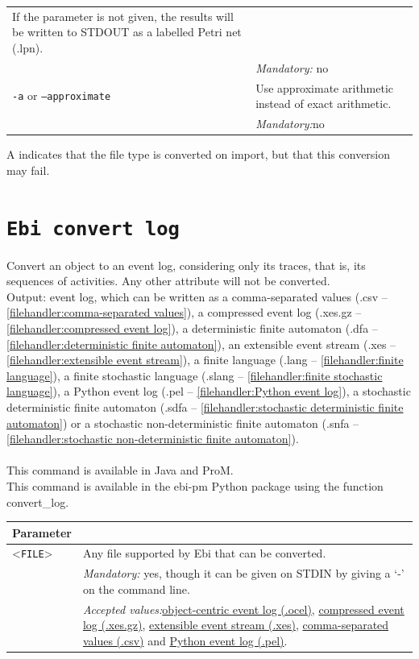 {\begin{tabularx}{\linewidth}{lX}
If the parameter is not given, the results will be written to STDOUT as a labelled Petri net (.lpn).\\
&\textit{Mandatory:} \quad no\\
\texttt{-a} or \texttt{--approximate} & Use approximate arithmetic instead of exact arithmetic.\\
&\textit{Mandatory:}\quad no\\
\bottomrule
\end{tabularx}
A \textdagger{} indicates that the file type is converted on import, but that this conversion may fail.
\clearpage\section{\texttt{Ebi convert log}}
\label{command:Ebi convert log}
Convert an object to an event log, considering only its traces, that is, its sequences of activities. Any other attribute will not be converted.\\
\noindent Output: event log, which can be written as a comma-separated values (.csv -- \cref{filehandler:comma-separated values}), a compressed event log (.xes.gz -- \cref{filehandler:compressed event log}), a deterministic finite automaton (.dfa -- \cref{filehandler:deterministic finite automaton}), an extensible event stream (.xes -- \cref{filehandler:extensible event stream}), a finite language (.lang -- \cref{filehandler:finite language}), a finite stochastic language (.slang -- \cref{filehandler:finite stochastic language}), a Python event log (.pel -- \cref{filehandler:Python event log}), a stochastic deterministic finite automaton (.sdfa -- \cref{filehandler:stochastic deterministic finite automaton}) or a stochastic non-deterministic finite automaton (.snfa -- \cref{filehandler:stochastic non-deterministic finite automaton}).\\
\\This command is available in Java and ProM.
\\This command is available in the ebi-pm Python package using the function convert\_log.
\begin{tabularx}{\linewidth}{lX}
\toprule
Parameter \\\midrule
<\texttt{FILE}>&Any file supported by Ebi that can be converted.\\
&\textit{Mandatory:} \quad yes, though it can be given on STDIN by giving a `-' on the command line.\\
&\textit{Accepted values:}\quad \hyperref[filehandler:object-centric event log]{object-centric event log (.ocel)}, \hyperref[filehandler:compressed event log]{compressed event log (.xes.gz)}, \hyperref[filehandler:extensible event stream]{extensible event stream (.xes)}, \hyperref[filehandler:comma-separated values]{comma-separated values (.csv)} and \hyperref[filehandler:Python event log]{Python event log (.pel)}.\\

\end{tabularx}}
